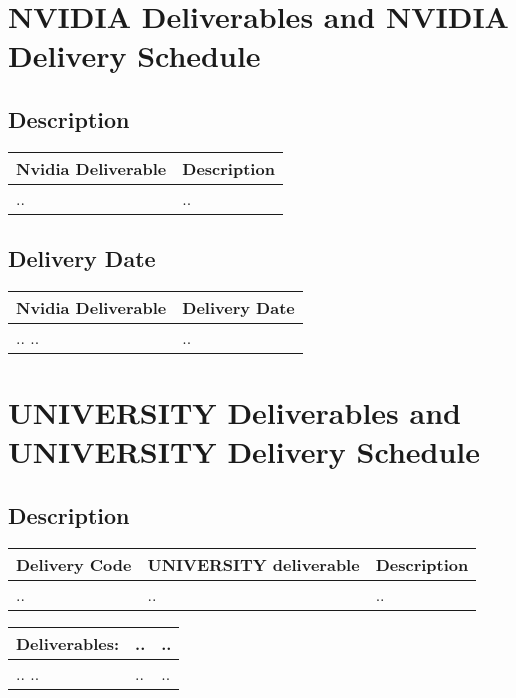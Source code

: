 \documentclass{article}[14pt]
\begin{document}
\pagebreak

\section{NVIDIA Deliverables and NVIDIA Delivery Schedule}
\subsection{Description}
\begin{center}
\begin{tabular}{ | l | l |}
\hline
Nvidia Deliverable & Description \\
\hline
.. & .. \\
\hline
\end{tabular}
\end{center}

\subsection{Delivery Date}

\begin{center}
\begin{tabular}{ | l | l |}
\hline
Nvidia Deliverable & Delivery Date \\
\hline
.. .. & .. \\
\hline
\end{tabular}
\end{center}

\pagebreak

\section{UNIVERSITY Deliverables and UNIVERSITY Delivery Schedule}

\subsection{Description}

\begin{center}
\begin{tabular}{ | l | l | l |}
\hline
Delivery Code & UNIVERSITY deliverable & Description \\
\hline
..  & .. & ..\\
\hline
\end{tabular}
\end{center}

\begin{center}
\begin{tabular}{ | l | l | l |}
\hline
Deliverables: & .. & .. \\
\hline
.. .. & .. & .. \\
\hline
\end{tabular}
\end{center}
\end{document}

